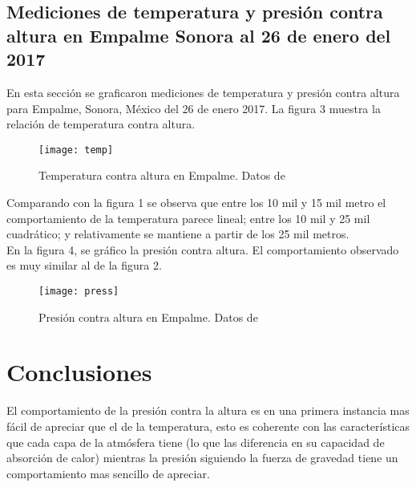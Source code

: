 \documentclass[12pt,letterpaper]{article}
\begin{document}
\subsection{Mediciones de temperatura y presión contra altura en Empalme Sonora al 26 de enero del 2017}

En esta sección se graficaron mediciones de temperatura y presión contra altura para Empalme, Sonora, México del 26 de enero 2017. La figura 3 muestra la relación de temperatura contra altura.\\

\begin{figure}[H]
	\centering
	\texttt{[image: temp]}
	\caption{Temperatura contra altura en Empalme. Datos de\cite{g}}
\end{figure}

Comparando con la figura 1 se observa que entre los 10 mil y 15 mil metro el comportamiento de la temperatura parece lineal; entre los 10 mil y 25 mil cuadrático; y relativamente se mantiene a partir de los 25 mil metros.\\

En la figura 4, se gráfico la presión contra altura. El comportamiento observado es muy similar al de la figura 2.\\

\begin{figure}[H]
	\centering
	\texttt{[image: press]}
	\caption{Presión contra altura en Empalme. Datos de\cite{g}}
\end{figure}

\section{Conclusiones} 

El comportamiento de la presión contra la altura es en una primera instancia mas fácil de apreciar que el de la temperatura, esto es coherente con las características que cada capa de la atmósfera tiene (lo que las diferencia en su capacidad de absorción de calor) mientras la presión siguiendo la fuerza de gravedad tiene un comportamiento mas sencillo de apreciar. 
\end{document}
